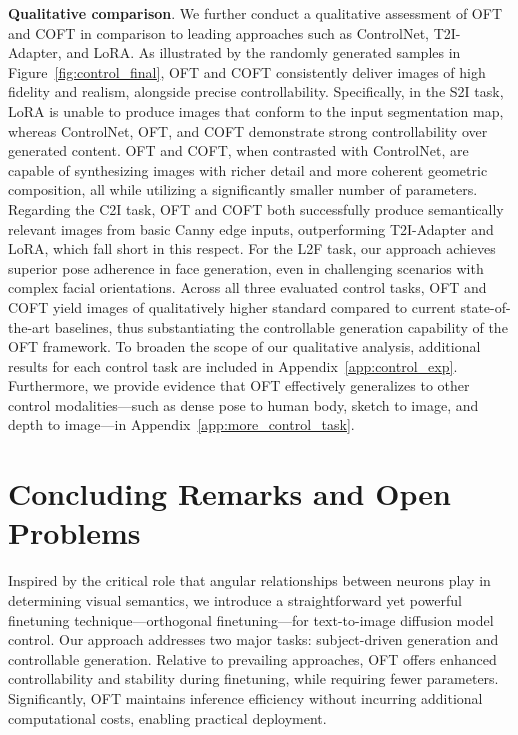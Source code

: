 {\textbf{Qualitative comparison}. We further conduct a qualitative assessment of OFT and COFT in comparison to leading approaches such as ControlNet, T2I-Adapter, and LoRA. As illustrated by the randomly generated samples in Figure~\ref{fig:control_final}, OFT and COFT consistently deliver images of high fidelity and realism, alongside precise controllability. Specifically, in the S2I task, LoRA is unable to produce images that conform to the input segmentation map, whereas ControlNet, OFT, and COFT demonstrate strong controllability over generated content. OFT and COFT, when contrasted with ControlNet, are capable of synthesizing images with richer detail and more coherent geometric composition, all while utilizing a significantly smaller number of parameters. Regarding the C2I task, OFT and COFT both successfully produce semantically relevant images from basic Canny edge inputs, outperforming T2I-Adapter and LoRA, which fall short in this respect. For the L2F task, our approach achieves superior pose adherence in face generation, even in challenging scenarios with complex facial orientations. Across all three evaluated control tasks, OFT and COFT yield images of qualitatively higher standard compared to current state-of-the-art baselines, thus substantiating the controllable generation capability of the OFT framework. To broaden the scope of our qualitative analysis, additional results for each control task are included in Appendix~\ref{app:control_exp}. Furthermore, we provide evidence that OFT effectively generalizes to other control modalities—such as dense pose to human body, sketch to image, and depth to image—in Appendix~\ref{app:more_control_task}.

\section{Concluding Remarks and Open Problems}

Inspired by the critical role that angular relationships between neurons play in determining visual semantics, we introduce a straightforward yet powerful finetuning technique—orthogonal finetuning—for text-to-image diffusion model control. Our approach addresses two major tasks: subject-driven generation and controllable generation. Relative to prevailing approaches, OFT offers enhanced controllability and stability during finetuning, while requiring fewer parameters. Significantly, OFT maintains inference efficiency without incurring additional computational costs, enabling practical deployment.

}
